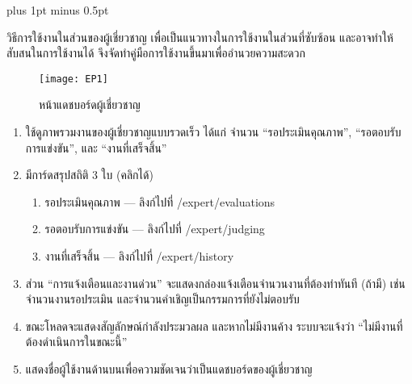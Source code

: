 
\clearpage
\thispagestyle{plain}

\begingroup
\fontsize{16pt}{19.2pt}\selectfont
\justifying
\XeTeXlinebreakskip=0pt plus 1pt minus 0.5pt
\setlength{\parindent}{1.5cm}
\setlength{\parskip}{0pt}

\indent วิธีการใช้งานในส่วนของผู้เชี่ยวชาญ เพื่อเป็นแนวทางในการใช้งานในส่วนที่ซับซ้อน และอาจทำให้สับสนในการใช้งานได้ จึงจัดทำคู่มือการใช้งานขึ้นมาเพื่ออำนวยความสะดวก

\vspace{\baselineskip}

\begin{figure}[h]
	\centering
	\texttt{[image: EP1]}
	\caption{หน้าแดชบอร์ดผู้เชี่ยวชาญ}
\end{figure}

\par

\begin{sloppypar}
	\begin{enumerate}
		\item ใช้ดูภาพรวมงานของผู้เชี่ยวชาญแบบรวดเร็ว ได้แก่ จำนวน “รอประเมินคุณภาพ”, “รอตอบรับการแข่งขัน”, และ “งานที่เสร็จสิ้น”
		\item มีการ์ดสรุปสถิติ 3 ใบ (คลิกได้)
		\begin{enumerate}
			\item รอประเมินคุณภาพ — ลิงก์ไปที่ /expert/evaluations
			\item รอตอบรับการแข่งขัน — ลิงก์ไปที่ /expert/judging
			\item งานที่เสร็จสิ้น — ลิงก์ไปที่ /expert/history
		\end{enumerate}
		\item ส่วน “การแจ้งเตือนและงานด่วน” จะแสดงกล่องแจ้งเตือนจำนวนงานที่ต้องทำทันที (ถ้ามี) เช่น จำนวนงานรอประเมิน และจำนวนคำเชิญเป็นกรรมการที่ยังไม่ตอบรับ
		\item ขณะโหลดจะแสดงสัญลักษณ์กำลังประมวลผล และหากไม่มีงานค้าง ระบบจะแจ้งว่า “ไม่มีงานที่ต้องดำเนินการในขณะนี้”
		\item แสดงชื่อผู้ใช้งานด้านบนเพื่อความชัดเจนว่าเป็นแดชบอร์ดของผู้เชี่ยวชาญ
	\end{enumerate}
\end{sloppypar}

\par

